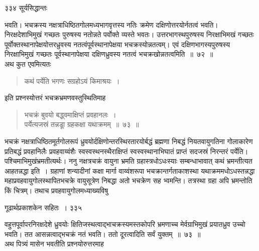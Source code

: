 \documentclass[11pt, openany]{book}
\begin{document}
\newpage


\noindent ३३४ \hspace{4cm} सूर्यसिद्धान्तः
\vspace{1cm}


\noindent भवति। भचक्रस्य नक्षत्राधिष्ठितगोलमध्यभागवृत्तस्य नतिः क्रमेण दक्षिणोत्तरयोर्नतत्वं भवति। निरक्षदेशाभिमुखं गच्छतः पुरुषस्य नतोन्नते पर्वोक्ते व्यस्ते भवतः। उत्तरभागस्थपुरुषस्य निरक्षाभिमखं गच्छतः पूर्वोक्तस्थानापेक्षयोत्तरध्रुवस्य नतत्वंपूर्वस्थानापेक्षया भचक्रस्योन्नतत्वम्। एवं दक्षिणभागस्यपुरुषस्य निरक्षाभिमुखं गच्छतः पूर्वस्थानापेक्षया दक्षिणध्रुवस्य नतत्वं भचक्रखोन्नतत्वमिति~॥~७२~॥ \\
\noindent अथ कुत एवमित्यतः \textendash

\begin{quote}
{\qt कथं पर्येति भगणः सग्रहोऽयं किमाश्रयः~। }
\end{quote}
\noindent इति प्रश्नस्योत्तरं भचक्रभ्रमणवस्तुस्थितिमाह \textendash


 \begin{quote}
{\ssi भचक्रं बुवयो बद्ध्वमाक्षिप्तं प्रवहानलः~।\\
पर्येत्यजस्रं तन्नडूा ग्रहकक्षा यथाक्रमम्~॥~७३~॥}
\end{quote}
 भचक्रं नक्षत्राधिष्ठितमूर्तगोलरूपं ध्रुवयोर्दक्षिणोन्तरस्थिरतारयोर्बद्धं ब्रह्मणा निबद्धं नियतवायुगतिना गोलाकारेण प्रतिबद्धं प्रवहानिलैः प्रवहवाय्वंशैः स्वस्वस्थनस्थैराक्षिप्तं स्वस्वस्थानाभिघातं प्राप्तं सदजस्रं निरन्तरं पर्येति। पश्चिमाभिमुखंभ्रमतीत्यर्थः। ननु नक्षत्रचक्रं वायुना भ्रमति ग्रहास्त्रधोऽधःस्याः सम्बन्धाभावात् कथं भ्रमन्तीत्यत आह\textendash तन्नद्धा इति~। ग्रहाणां शन्यादीनां कक्षा मार्गा वाय्वंशरूपा भचक्रान्तर्गताकाशस्था यथाक्रममधोऽधस्तन्नद्धा महाप्रवहवायुगोलस्थापितभचक्रे वायुसूत्रेण निबद्धा अतो भचक्रेण सह भ्वमन्ति। तत्रस्था ग्रहा अपि भ्रमन्तोति किं चित्रम्। तथाच प्रवहवायुगोलमध्याख्यविषु \textendash
%


\newpage


\hspace{3cm} गूढार्थप्रकाशकेन सहितः~। \hfill ३३५
\vspace{1cm}

%
\noindent वहुत्तपूर्वापरनिरक्षदेशे ध्रुवयोः क्षितिजस्थत्वाद्भाचक्रस्यमस्तकोपरि भ्रमणाच्च मेर्वग्राभिमुखं प्रयातध्रुव उच्चो भवति। तत आसन्नत्वाद्भचक्रं नतं भवति। ततो दूरत्वादिति सर्वं युक्तम्~॥~७३~॥ \\
\noindent अथ पित्र्यं मासेन भवतीति प्रश्नयोरुत्तरमाह \textendash
\end{document}
